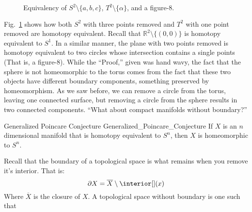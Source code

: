             \begin{figure}[H]
                    \centering
                    \captionsetup{type=figure}
                    \resizebox{\textwidth}{!}{%
                    }
                    \caption{Equivalency of $S^{2}\setminus\{a,b,c\}$,
                             $T^{2}\setminus\{\alpha\}$, and a figure-8.}
                    \label{fig:homotopy_equivalence_sphere_%
                           with_3_holes_torus_with_1_hole}
            \end{figure} 
            Fig.~\ref{fig:homotopy_equivalence_sphere_%
                           with_3_holes_torus_with_1_hole} shows how both
            $S^{2}$ with three points removed and $T^{2}$ with one point removed
            are homotopy equivalent. Recall that
            $\mathbb{R}^{2}\setminus \{(0,0)\}$ is homotopy equivalent to
            $S^{1}$. In a similar manner, the plane with two points removed is
            homotopy equivalent to two circles whose intersection contains a
            single points (That is, a figure-$8$). While the ``Proof,'' given
            was hand wavy, the fact that the sphere is not homeomorphic to the
            torus comes from the fact that these two objects have different
            boundary components, something preserved by homeomorphism. As we
            saw before, we can remove a circle from the torus, leaving one
            connected surface, but removing a circle from the sphere results in 
            two connected components. ``What about compact manifolds without
            boundary?''
            \begin{ltheorem}{Generalized Poincare Conjecture}
                            {Generalized_Poincare_Conjecture}
                If $X$ is an $n$ dimensional manifold that
                is homotopy equivalent to $S^{n}$, then $X$
                is homeomorphic to $S^{n}$.
            \end{ltheorem}
            \vspace{5pt}
            Recall that the boundary of a topological space
            is what remains when you remove it's interior.
            That is:
            \begin{equation}
                \partial{X}=\overline{X}\setminus\interior[](x)
            \end{equation}
            Where $\overline{X}$ is the closure of $X$.
            A topological space without boundary is one such that
